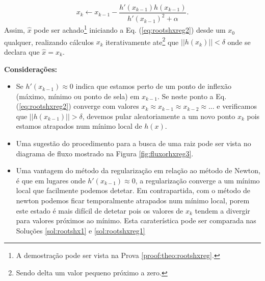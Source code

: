 \begin{theorem}
\begin{equation}\label{eq:rootshxreg2}
x_{k} \leftarrow x_{k-1}-\frac{ h'(x_{k-1})h(x_{k-1})}{h'(x_{k-1})^2+\alpha}.
\end{equation}
Assim, $\hat{x}$ pode ser achado\footnote{A 
demostração pode ser vista na Prova \ref{proof:theo:rootshxreg}.} 
iniciando a Eq. (\ref{eq:rootshxreg2}) desde um 
$x_{0}$ qualquer, realizando cálculos $x_{k}$ iterativamente  
ate\footnote{Sendo delta um valor pequeno próximo a zero.} que $||h(x_k)||<\delta$
onde se declara que $\hat{x}=x_k$.

\textbf{Considerações:}
\begin{itemize} 
\item Se $h'(x_{k-1})\approx 0$ indica que estamos perto de um ponto de inflexão 
(máximo, mínimo ou ponto de sela) em $x_{k-1}$. Se neste ponto a Eq. (\ref{eq:rootshxreg2})
converge com valores $x_k\approx x_{k-1}\approx x_{k-2}\approx ...$ e verificamos que $||h(x_{k-1})||>\delta$,
devemos pular aleatoriamente a um novo ponto $x_k$ pois estamos atrapados num mínimo local de $h(x)$.  
\item Uma sugestão do procedimento para a busca de uma raiz pode ser vista no diagrama de fluxo
mostrado na Figura \ref{fig:fluxorhxreg3}. 
\end{itemize}
\end{theorem}

\begin{tcbattention}
\begin{itemize}
\item Uma vantagem do método da regularização em relação ao método de Newton,
é que em lugares onde $h'(x_{k-1})\approx 0$, a regularização converge a um mínimo local 
que facilmente podemos detetar. Em contrapartida,
com o método de newton podemos ficar temporalmente atrapados num mínimo local, porem este estado 
é mais difícil de detetar pois os valores de $x_k$ tendem a divergir para valores próximos ao mínimo.
Esta caraterística pode ser comparada nas Soluções \ref{sol:rootshx1} e \ref{sol:rootshxreg1}
\end{itemize}
\end{tcbattention}

